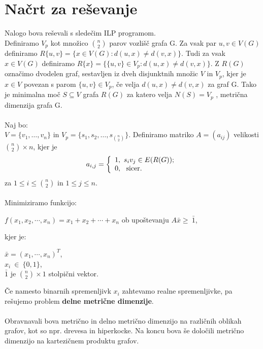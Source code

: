 \documentclass[a4paper]{report}
\begin{document}
\section{Načrt za reševanje}
Nalogo bova reševali s sledečim ILP programom.\\
Definiramo $V_p$ kot množico $\binom{n}{2}$ parov vozlišč grafa G. Za vsak par $u,v \in V(G)$ definiramo $R\{u,v\}=\{x \in V(G): d(u,x)\neq d(v,x)\}.$ Tudi za vsak $x \in V(G)$ definiramo $R\{x\}= \{\{u,v\}\in V_p: d(u,x)\neq d(v,x)\}$. Z $R(G)$ označimo dvodelen graf, sestavljen iz dveh disjunktnih množic $V$ in $V_p$, kjer je $x \in V$ povezan s parom $\{u,v\} \in V_p$, če velja $d(u,x)\neq d(v,x)$ za graf G.  Tako je minimalna moč $S \subseteq V$ grafa $R(G)$ za katero velja $N(S) = V_p$  , metrična dimenzija grafa G. \\\\
Naj bo:\\
$V = \{v_1,\dots, v_n\}$ in $V_p = \{s_1,s_2,\dots,s_{\binom{n}{2}} \} $. Definiramo matriko  $ A = (a_{ij})$  velikosti $\binom{n}{2} \times n$, kjer je\[ a_{i,j}  =  \left \{ \begin{array}{l}1,\ \mbox{$ s_i v_j \in E(R(G))$}; \\0,\ \mbox{ sicer}. \end{array} \right. \]
za $1\le i\le \binom{n}{2}$ in $1\le  j\le n$.\\
\pagebreak
\\
 Minimiziramo funkcijo: \begin{center}$f(x_1,x_2, \cdots,x_n)=x_1+x_2+\cdots+x_n$ 
ob upoštevanju $A\bar{x}\ge\ \bar{1}$,\end{center} 
kjer je: \begin{center}
 $\bar{x}=(x_1,\cdots,x_n)^T$,\\
$x_i\ \in\ \{0,1 \}$,\\
$\bar{1}$ je $\binom{n}{2}\times 1$  stolpični vektor. \end{center}
Če namesto binarnih spremenljivk $x_i$ zahtevamo realne spremenljivke, pa rešujemo problem \textbf{delne metrične dimenzije}. \\\\
Obravnavali bova metrično in delno metrično dimenzijo na različnih oblikah grafov, kot so npr. drevesa in hiperkocke. Na koncu bova še določili metrično dimenzijo na kartezičnem produktu grafov. \\
\end{document}

